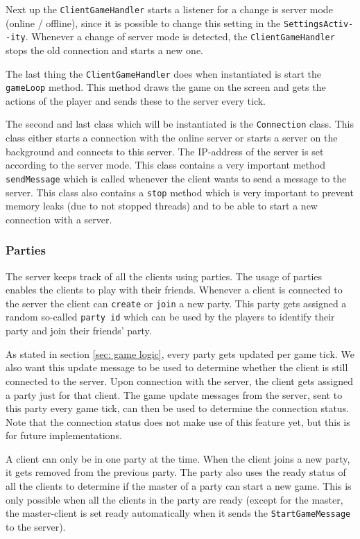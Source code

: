 \documentclass[../main.tex]{subfiles}
\begin{document}
		Next up the \texttt{ClientGameHandler} starts a listener for a change is server mode (online / offline), since it is possible to change this setting in the \texttt{SettingsActiv-} \texttt{-ity}. Whenever a change of server mode is detected, the \texttt{ClientGameHandler} stops the old connection and starts a new one. 
		
		The last thing the \texttt{ClientGameHandler} does when instantiated is start the \texttt{gameLoop} method. This method draws the game on the screen and gets the actions of the player and sends these to the server every tick.

		The second and last class which will be instantiated is the \texttt{Connection} class. This class either starts a connection with the online server or starts a server on the background and connects to this server. The IP-address of the server is set according to the server mode. This class contains a very important method \texttt{sendMessage} which is called whenever the client wants to send a message to the server. This class also contains a \texttt{stop} method which is very important to prevent memory leaks (due to not stopped threads) and to be able to start a new connection with a server. 

		\subsubsection{Parties}
		The server keeps track of all the clients using parties. The usage of parties enables the clients to play with their friends. Whenever a client is connected to the server the client can \texttt{create} or \texttt{join} a new party. This party gets assigned a random so-called \texttt{party id} which can be used by the players to identify their party and join their friends' party.
		
		As stated in section \ref{sec: game logic}, every party gets updated per game tick. We also want this update message to be used to determine whether the client is still connected to the server. Upon connection with the server, the client gets assigned a party just for that client. The game update messages from the server, sent to this party every game tick, can then be used to determine the connection status. Note that the connection status does not make use of this feature yet, but this is for future implementations.

		A client can only be in one party at the time. When the client joins a new party, it gets removed from the previous party. The party also uses the ready status of all the clients to determine if the master of a party can start a new game. This is only possible when all the clients in the party are ready (except for the master, the master-client is set ready automatically when it sends the \texttt{StartGameMessage} to the server).
\end{document}
